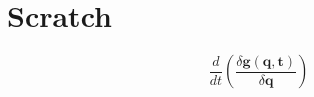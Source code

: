 \documentclass[12pt]{article} %
\begin{document}
	
	
	\section{Scratch}
	
	\begin{equation}
		\frac{d}{dt}(\frac{\delta\mathbf{g(\mathbf{q},t)}}{\delta\mathbf{q}})
	\end{equation}
	
	
	
	
	
\end{document}
